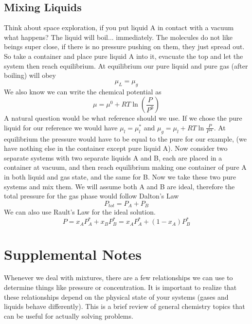 \documentclass{article}
\begin{document}
 \subsection*{Mixing Liquids}
 Think about space exploration, if you put liquid A in contact with a vacuum what happens?
 The liquid will boil... immediately.
 The molecules do not like beings super close, if there is no pressure pushing on them, they just spread out. 
 So take a container and place pure liquid A into it, evacuate the top and let the system then reach equilibrium. 
 At equilibrium our pure liquid and pure gas (after boiling) will obey 
 \begin{equation}
     \mu_L = \mu_g
 \end{equation}
We also know we can write the chemical potential as 
\begin{equation}
    \mu = \mu^0 + RT \ln\left(\frac{P}{P^0}\right)
\end{equation}
A natural question would be what reference should we use. 
If we chose the pure liquid for our reference we would have $\mu_l = \mu_l^*$ and $\mu_g = \mu_l +RT\ln\frac{P}{P*}$. 
At equilibrium the pressure would have to be equal to the pure for our example, (we have nothing else in the container except pure liquid A). 
Now consider two separate systems with two separate liquids A and B, each are placed in a container at vacuum, and then reach equilibrium making one container of pure A in both liquid and gas state, and the same for B. 
Now we take these two pure systems and mix them. 
We will assume both A and B are ideal, therefore the total pressure for the gas phase would follow Dalton's Law
\begin{equation}
    P_{tot} = P_A + P_B
\end{equation}
We can also use Rault's Law for the ideal solution. 
\begin{equation}
    P = x_AP_A^* + x_BP_B^* = x_AP_A^* + (1-x_A)P_B^*
\end{equation}

\section{Supplemental Notes}
Whenever we deal with mixtures, there are a few relationships we can use to determine things like pressure or concentration. 
It is important to realize that these relationships depend on the physical state of your systems (gases and liquids behave differently). 
This is a brief review of general chemistry topics that can be useful for actually solving problems. 
\end{document}
